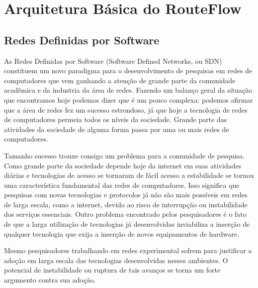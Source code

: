 \chapter{Arquitetura Básica do RouteFlow}

\section{Redes Definidas por Software} As Redes Definidas
por Software (Software Defined Networks, ou SDN) constituem
um novo paradigma para o desenvolvimento de pesquisas em
redes de computadores que vem ganhando a atenção de grande
parte da comunidade acadêmica e da industria da área de
redes. Fazendo um balanço geral da situação que encontramos
hoje podemos dizer que é um pouco complexa: podemos afirmar
que a área de redes fez um sucesso estrondoso, já que hoje a
tecnologia de redes de computadores permeia todos os níveis
da sociedade. Grande parte das atividades da sociedade de
alguma forma passa por uma ou mais redes de computadores.

Tamanho sucesso trouxe consigo um problema para a comunidade
de pesquisa. Como grande parte da sociedade depende hoje da
internet em suas atividades diárias e tecnologias de acesso
se tornaram de fácil acesso a estabilidade se tornou uma
característica fundamental das redes de computadores. Isso
significa que pesquisas com novas tecnologias e protocolos
já não são mais possíveis em redes de larga escala, como a
internet, devido ao risco de interrupção ou instabilidade
dos serviços essenciais. Outro problema encontrado pelos
pesquisadores é o fato de que a larga utilização de
tecnologias já desenvolvidas inviabiliza a inserção de
qualquer tecnologia que exija a inserção de novos
equipamentos de hardware.

Mesmo pesquisadores trabalhando em redes experimental sofrem
para justificar a adoção em larga escala das tecnologias
desenvolvidas nesses ambientes. O potencial de instabilidade
ou ruptura de tais avanços se torna um forte argumento
contra sua adoção.


